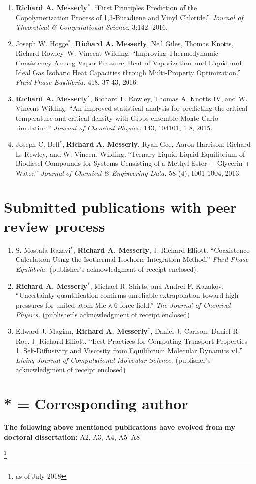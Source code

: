 \documentclass[12pt]{article}
\newcommand\blfootnote[1]{%
	\begingroup
	\renewcommand\thefootnote{}\footnote{#1}%
	\addtocounter{footnote}{-1}%
	\endgroup
}
\begin{document}
\begin{enumerate}
\item \textbf{Richard A. Messerly}$^*$. ``First Principles Prediction of the Copolymerization Process of 1,3-Butadiene and Vinyl Chloride.'' \textit{Journal of Theoretical \& Computational Science.} 3:142. 2016.

\item Joseph W. Hogge$^*$, \textbf{Richard A. Messerly}, Neil Giles, Thomas Knotts, Richard Rowley, W. Vincent Wilding. ``Improving Thermodynamic Consistency Among Vapor Pressure, Heat of Vaporization, and Liquid and Ideal Gas Isobaric Heat Capacities through Multi{-}Property Optimization.'' \textit{Fluid Phase Equilibria.} 418, 37-43, 2016.

\item \textbf{Richard A. Messerly}$^*$, Richard L. Rowley, Thomas A. Knotts IV, and W. Vincent Wilding. ``An improved statistical analysis for predicting the critical temperature and critical density with Gibbs ensemble Monte Carlo simulation.'' \textit{Journal of Chemical Physics.} 143, 104101, 1-8, 2015.

\item Joseph C. Bell$^*$, \textbf{Richard A. Messerly}, Ryan Gee, Aaron Harrison, Richard L. Rowley, and W. Vincent Wilding. ``Ternary Liquid{-}Liquid Equilibrium of Biodiesel Compounds for Systems Consisting of a Methyl Ester + Glycerin + Water.'' \textit{Journal of Chemical \& Engineering Data.} 58 (4), 1001-1004, 2013.

\end{enumerate}

\section{Submitted publications with peer review process}

\begin{enumerate}
	
\item S. Mostafa Razavi$^*$, \textbf{Richard A. Messerly}, J. Richard Elliott. ``Coexistence Calculation Using the Isothermal-Isochoric Integration Method.'' \textit{Fluid Phase Equilibria.} (publisher's acknowledgment of receipt enclosed).

\item \textbf{Richard A. Messerly}$^*$, Michael R. Shirts, and Andrei F. Kazakov. ``Uncertainty quantification confirms unreliable extrapolation toward high pressures for united-atom Mie λ-6 force field.'' \textit{The Journal of Chemical Physics.} (publisher's acknowledgment of receipt enclosed)

\item Edward J. Maginn, \textbf{Richard A. Messerly}$^*$, Daniel J. Carlson, Daniel R. Roe, J. Richard Elliott. ``Best Practices for Computing Transport Properties 1. Self-Diffusivity and Viscosity from Equilibrium Molecular Dynamics v1.'' \textit{Living Journal of Computational Molecular Science.} (publisher's acknowledgment of receipt enclosed)

\end{enumerate}

\section*{* = Corresponding author}

\textbf{The following above mentioned publications have evolved from my doctoral dissertation:} A2, A3, A4, A5, A8

\blfootnote{as of July 2018}
\end{document}
